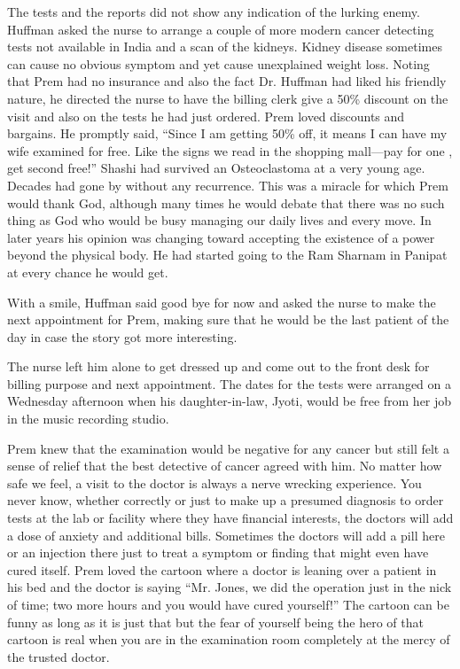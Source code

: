 The tests and the reports did not show any indication of the lurking
enemy. Huffman asked the nurse to arrange a couple of more modern cancer
detecting tests not available in India and a scan of the kidneys. Kidney
disease sometimes can cause no obvious symptom and yet cause unexplained
weight loss. Noting that Prem had no insurance and also the fact Dr.
Huffman had liked his friendly nature, he directed the nurse to have the
billing clerk give a 50\% discount on the visit and also on the tests he
had just ordered. Prem loved discounts and bargains. He promptly said,
``Since I am getting 50\% off, it means I can have my wife examined for
free. Like the signs we read in the shopping mall---pay for one , get
second free!'' Shashi had survived an Osteoclastoma at a very young age.
Decades had gone by without any recurrence. This was a miracle for which
Prem would thank God, although many times he would debate that there was
no such thing as God who would be busy managing our daily lives and
every move. In later years his opinion was changing toward accepting the
existence of a power beyond the physical body. He had started going to
the Ram Sharnam in Panipat at every chance he would get.

With a smile, Huffman said good bye for now and asked the nurse to make
the next appointment for Prem, making sure that he would be the last
patient of the day in case the story got more interesting.

The nurse left him alone to get dressed up and come out to the front
desk for billing purpose and next appointment. The dates for the tests
were arranged on a Wednesday afternoon when his daughter-in-law, Jyoti,
would be free from her job in the music recording studio.

Prem knew that the examination would be negative for any cancer but
still felt a sense of relief that the best detective of cancer agreed
with him. No matter how safe we feel, a visit to the doctor is always a
nerve wrecking experience. You never know, whether correctly or just to
make up a presumed diagnosis to order tests at the lab or facility where
they have financial interests, the doctors will add a dose of anxiety
and additional bills. Sometimes the doctors will add a pill here or an
injection there just to treat a symptom or finding that might even have
cured itself. Prem loved the cartoon where a doctor is leaning over a
patient in his bed and the doctor is saying ``Mr. Jones, we did the
operation just in the nick of time; two more hours and you would have
cured yourself!'' The cartoon can be funny as long as it is just that
but the fear of yourself being the hero of that cartoon is real when you
are in the examination room completely at the mercy of the trusted
doctor.

